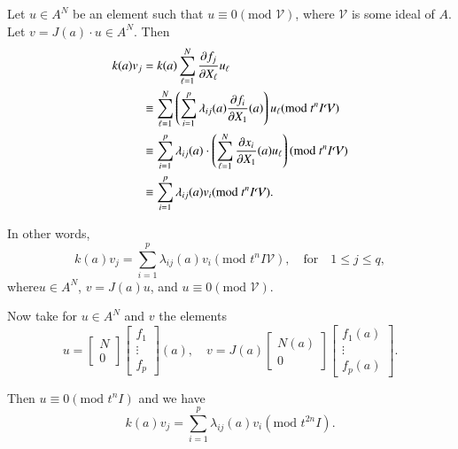 Let $u\in A^{N}$ be an element such that $u\equiv
0(\text{mod~}\mathcal{V})$, where $\mathcal{V}$ is some ideal of
$A$. Let $v=J(a)\cdot u\in A^{N}$. Then
\begin{align*}
k(a)v_{j} &= k(a)\sum^{N}_{\ell=1}\frac{\partial f_{j}}{\partial
  X_{\ell}}u_{\ell}\\
&\equiv \sum^{N}_{\ell=1}\left(\sum^{p}_{i=1}\lambda_{ij}(a)\frac{\partial
  f_{i}}{\partial X_{1}}(a)\right)u_{\ell}(\text{mod~}t^{n}I\mathcal{V})\\
&\equiv \sum^{p}_{i=1}\lambda_{ij}(a)\cdot
\left(\sum^{N}_{\ell=1}\frac{\partial x_{i}}{\partial
  X_{1}}(a)u_{\ell}\right)(\text{mod~}t^{n}I\mathcal{V})\\
&\equiv
\sum^{p}_{i=1}\lambda_{ij}(a)v_{i}(\text{mod~}t^{n}I\mathcal{V}). 
\end{align*}

In other words,
\begin{equation*}
k(a)v_{j}=\sum^{p}_{i=1}\lambda_{ij}(a)v_{i}(\text{mod~}t^{n}I\mathcal{V}),\quad\text{for}\quad
1\leq j\leq q,\tag{II}
\end{equation*}
where\pageoriginale $u\in A^{N}$, $v=J(a)u$, and $u\equiv
0(\text{mod~}\mathcal{V})$.

Now take for $u\in A^{N}$ and $v$ the elements
$$
u=
\begin{bmatrix}
N\\
0
\end{bmatrix}
\begin{bmatrix}
f_{1}\\
\vdots\\
f_{p}
\end{bmatrix}
(a),\quad v=J(a)
\begin{bmatrix}
N(a)\\
0
\end{bmatrix}
\begin{bmatrix}
f_{1}(a)\\
\vdots\\
f_{p}(a)
\end{bmatrix}.
$$

Then $u\equiv 0(\text{mod~}t^{n}I)$ and we have
$$
k(a)v_{j}=\sum^{p}_{i=1}\lambda_{ij}(a)v_{i}(\text{mod~}t^{2n}I).
$$

